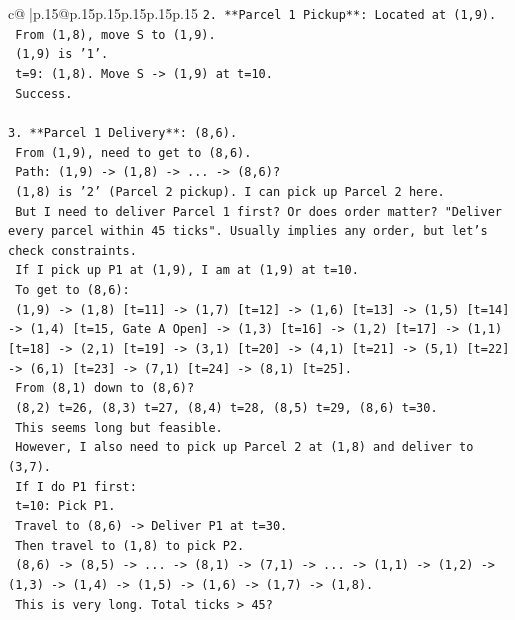 \documentclass{article}
\begin{document}
{\begin{supertabular}{c@{$\;$}|p{.15\linewidth}@{}p{.15\linewidth}p{.15\linewidth}p{.15\linewidth}p{.15\linewidth}p{.15\linewidth}}
{{{\texttt{2.  **Parcel 1 Pickup**: Located at (1,9).} \\
\texttt{    From (1,8), move S to (1,9).} \\
\texttt{    (1,9) is '1'.} \\
\texttt{    t=9: (1,8). Move S {-}> (1,9) at t=10.} \\
\texttt{    Success.} \\
\\ 
\texttt{3.  **Parcel 1 Delivery**: (8,6).} \\
\texttt{    From (1,9), need to get to (8,6).} \\
\texttt{    Path: (1,9) {-}> (1,8) {-}> ... {-}> (8,6)?} \\
\texttt{    (1,8) is '2' (Parcel 2 pickup). I can pick up Parcel 2 here.} \\
\texttt{    But I need to deliver Parcel 1 first? Or does order matter? "Deliver every parcel within 45 ticks". Usually implies any order, but let's check constraints.} \\
\texttt{    If I pick up P1 at (1,9), I am at (1,9) at t=10.} \\
\texttt{    To get to (8,6):} \\
\texttt{    (1,9) {-}> (1,8) {[}t=11{]} {-}> (1,7) {[}t=12{]} {-}> (1,6) {[}t=13{]} {-}> (1,5) {[}t=14{]} {-}> (1,4) {[}t=15, Gate A Open{]} {-}> (1,3) {[}t=16{]} {-}> (1,2) {[}t=17{]} {-}> (1,1) {[}t=18{]} {-}> (2,1) {[}t=19{]} {-}> (3,1) {[}t=20{]} {-}> (4,1) {[}t=21{]} {-}> (5,1) {[}t=22{]} {-}> (6,1) {[}t=23{]} {-}> (7,1) {[}t=24{]} {-}> (8,1) {[}t=25{]}.} \\
\texttt{    From (8,1) down to (8,6)?} \\
\texttt{    (8,2) t=26, (8,3) t=27, (8,4) t=28, (8,5) t=29, (8,6) t=30.} \\
\texttt{    This seems long but feasible.} \\
\texttt{    However, I also need to pick up Parcel 2 at (1,8) and deliver to (3,7).} \\
\texttt{    If I do P1 first:} \\
\texttt{    t=10: Pick P1.} \\
\texttt{    Travel to (8,6) {-}> Deliver P1 at t=30.} \\
\texttt{    Then travel to (1,8) to pick P2.} \\
\texttt{    (8,6) {-}> (8,5) {-}> ... {-}> (8,1) {-}> (7,1) {-}> ... {-}> (1,1) {-}> (1,2) {-}> (1,3) {-}> (1,4) {-}> (1,5) {-}> (1,6) {-}> (1,7) {-}> (1,8).} \\
\texttt{    This is very long. Total ticks > 45?} \\
}}}
\end{supertabular}}
\end{document}
